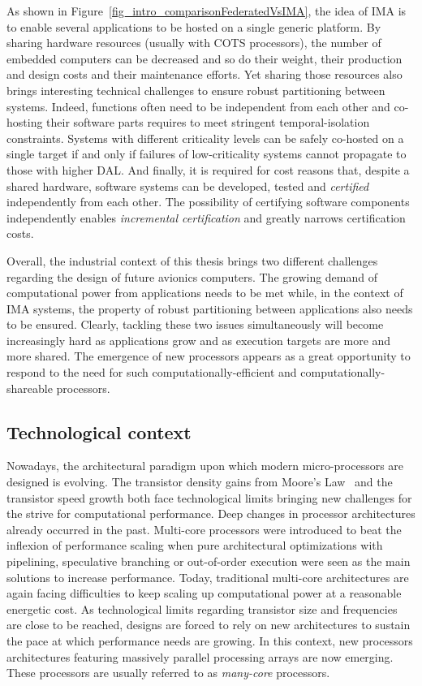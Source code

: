 \documentclass[main.tex]{subfiles}
\begin{document}
As shown in Figure~\ref{fig_intro_comparisonFederatedVsIMA}, the idea of IMA is to enable several applications to be hosted on a single generic platform. By sharing hardware resources (usually with COTS processors), the number of embedded computers can be decreased and so do their weight, their production and design costs and their maintenance efforts. Yet sharing those resources also brings interesting technical challenges to ensure robust partitioning between systems. Indeed, functions often need to be independent from each other and co-hosting their software parts requires to meet stringent temporal-isolation constraints. Systems with different criticality levels can be safely co-hosted on a single target if and only if failures of low-criticality systems cannot propagate to those with higher DAL. And finally, it is required for cost reasons that, despite a shared hardware, software systems can be developed, tested and \emph{certified} independently from each other. The possibility of certifying software components independently enables \emph{incremental certification} and greatly narrows certification costs.

Overall, the industrial context of this thesis brings two different challenges regarding the design of future avionics computers. The growing demand of computational power from applications needs to be met while, in the context of IMA systems, the property of robust partitioning between applications also needs to be ensured. Clearly, tackling these two issues simultaneously will become increasingly hard as applications grow and as execution targets are more and more shared. The emergence of new processors appears as a great opportunity to respond to the need for such computationally-efficient and computationally-shareable processors.




\subsection{Technological context}
Nowadays, the architectural paradigm upon which modern micro-processors are designed is evolving. The transistor density gains from Moore's Law~\cite{Moore1975} and the transistor speed growth both face technological limits bringing new challenges for the strive for computational performance. Deep changes in processor architectures already occurred in the past. Multi-core processors were introduced to beat the inflexion of performance scaling when pure architectural optimizations with pipelining, speculative branching or out-of-order execution were seen as the main solutions to increase performance.
Today, traditional multi-core architectures are again facing difficulties to keep scaling up computational power at a reasonable energetic cost. As technological limits regarding transistor size and frequencies are close to be reached, designs are forced to rely on new architectures to sustain the pace at which performance needs are growing. In this context, new processors architectures featuring massively parallel processing arrays are now emerging. These processors are usually referred to as \emph{many-core} processors.
\end{document}
